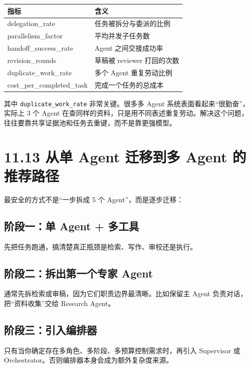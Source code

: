 \begingroup
\scriptsize
\setlength{\tabcolsep}{3pt}
\begin{longtable}{|p{}|p{}|}
\hline
指标 & 含义 \\ \hline
delegation\_rate & 任务被拆分与委派的比例 \\ \hline
parallelism\_factor & 平均并发子任务数 \\ \hline
handoff\_success\_rate & Agent 之间交接成功率 \\ \hline
revision\_rounds & 草稿被 reviewer 打回的次数 \\ \hline
duplicate\_work\_rate & 多个 Agent 重复劳动比例 \\ \hline
cost\_per\_completed\_task & 完成一个任务的总成本 \\ \hline
\end{longtable}
\endgroup

其中 \texttt{duplicate\_work\_rate} 非常关键。很多多 Agent 系统表面看起来``很勤奋''，实际上 3 个 Agent 在查同样的资料，只是用不同表述重复劳动。解决这个问题，往往要靠共享证据池和任务去重键，而不是靠更强模型。


\section{11.13 从单 Agent 迁移到多 Agent 的推荐路径}

最安全的方式不是``一步拆成 5 个 Agent''，而是逐步迁移：


\subsection{阶段一：单 Agent + 多工具}

先把任务跑通，搞清楚真正瓶颈是检索、写作、审校还是执行。


\subsection{阶段二：拆出第一个专家 Agent}

通常先拆检索或审稿，因为它们职责边界最清晰。比如保留主 Agent 负责对话，把``资料收集''交给 Research Agent。


\subsection{阶段三：引入编排器}

只有当你确定存在多角色、多阶段、多预算控制需求时，再引入 Supervisor 或 Orchestrator。否则编排器本身会成为额外复杂度来源。


